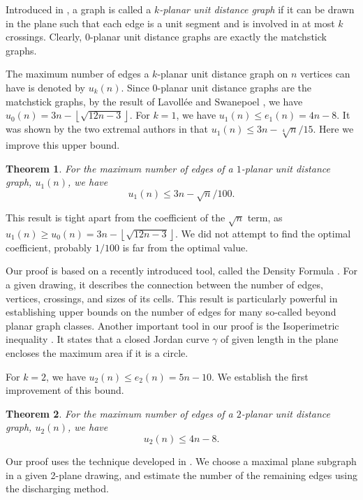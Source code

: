 \documentclass[10pt]{article}
\newtheorem{theorem}{Theorem}
\theoremstyle{definition}
\begin{document}
Introduced in \cite{GT25}, a graph is called a \emph{$k$-planar unit distance graph} if it can be drawn in the plane such that each edge is a unit segment and is involved in at most $k$ crossings. Clearly,
$0$-planar unit distance graphs are exactly the matchstick graphs. 


The maximum number of edges a $k$-planar unit distance graph on $n$ vertices can have is denoted by $u_k(n)$. Since $0$-planar unit distance graphs are the matchstick graphs, by the result of Lavoll\'ee and Swanepoel \cite{LS22}, 
we have $u_0(n)= 3n - \left\lfloor\sqrt{12n - 3}\right\rfloor$. For $k=1$, we have $u_1(n)\le e_1(n)=4n-8$. It was shown by the two extremal authors in \cite{GT25} that $u_1(n)\le 3n-\sqrt[4]{n}/15$. 
Here we improve this upper bound.
\begin{theorem} \label{thm_1planar}
For the maximum number of edges of a $1$-planar unit distance graph, $u_1(n)$, we have
    $$u_1(n) \leq 3n - \sqrt{n}/100.$$
\end{theorem}


This result is tight apart from the 
coefficient of the $\sqrt{n}$ term, 
as $u_1(n)\ge u_0(n)=3n - \left\lfloor\sqrt{12n - 3}\right\rfloor$. 
We did not attempt to find the optimal coefficient, 
probably $1/100$ is far from the optimal value.

Our proof is based on a recently introduced tool, called the Density Formula \cite{KKKRSU23}. 
For a given drawing, it describes the connection between the number of edges, vertices, crossings, and sizes of its cells. 
This result is particularly powerful in establishing upper bounds on the number of edges for 
many so-called beyond planar graph classes. 
Another important tool in our proof is the 
Isoperimetric inequality \cite{C13}. 
It states that a closed Jordan curve $\gamma$ of given length in the plane encloses the maximum area if it is a circle. 

For $k=2$, we have $u_2(n)\le e_2(n)=5n-10$. 
We establish the first improvement of this bound.

\begin{theorem} \label{thm_2planar}
For the maximum number of edges of a $2$-planar unit distance graph, $u_2(n)$, we have
    $$u_2(n) \leq 4n-8.$$
\end{theorem}

Our proof uses the technique developed in \cite{PT97}. 
We choose a maximal plane subgraph in a given 2-plane drawing, 
and estimate the number of the remaining edges using the discharging method. 
\end{document}
